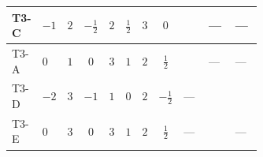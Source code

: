 \documentclass[8pt]{article}
\begin{document}
\begin{landscape}
\begin{longtable}{@{}llcccccc >{\raggedright\arraybackslash}p{0.21\linewidth} >{\raggedright\arraybackslash}p{0.21\linewidth} >{\raggedright\arraybackslash}p{0.21\linewidth}@{}}
\midrule
T3-C & $-1$ & $2$ & $-\frac{1}{2}$ & $2$ & $\frac{1}{2}$ & $3$ & $0$ & \scriptsize\adjustbox{max width=\linewidth}{$\begin{gathered} +6 {\lambda_{S_1}} {m_{S_1}^2}\end{gathered}$} & --- & --- \\
\midrule
T3-A & $0$ & $1$ & $0$ & $3$ & $1$ & $2$ & $\frac{1}{2}$ & \scriptsize\adjustbox{max width=\linewidth}{$\begin{gathered} +4 {\lambda_{S_1}} {m_{S_1}^2}\end{gathered}$} & --- & --- \\
\midrule
T3-D & $-2$ & $3$ & $-1$ & $1$ & $0$ & $2$ & $-\frac{1}{2}$ & --- & \scriptsize\adjustbox{max width=\linewidth}{$\begin{gathered} -12 {g_2}^2 {m_{S_1}^2}\end{gathered}$} & \scriptsize\adjustbox{max width=\linewidth}{$\begin{gathered} -6 {g_Y}^2 {m_{S_1}^2}\end{gathered}$} \\
\midrule
T3-E & $0$ & $3$ & $0$ & $3$ & $1$ & $2$ & $\frac{1}{2}$ & --- & \scriptsize\adjustbox{max width=\linewidth}{$\begin{gathered} -12 {g_2}^2 {m_{S_1}^2}\end{gathered}$} & --- \\
\midrule
\bottomrule
\end{longtable}
\clearpage

\end{landscape}
\end{document}

